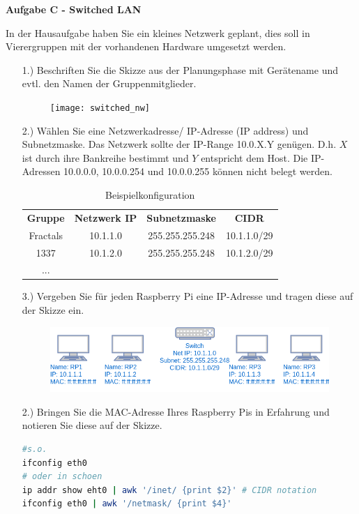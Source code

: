 \documentclass[paper=a4,fontsize=11pt]{scrartcl}%
\numberwithin{equation}{section}
\begin{document}
\begin{center}\Large{\textbf{Aufgabe C - Switched LAN}}\end{center}\vskip0.25in
In der Hausaufgabe haben Sie ein kleines Netzwerk geplant, dies soll in Vierergruppen mit der vorhandenen Hardware umgesetzt werden.
\begin{itemize}
	\item[1.)] Beschriften Sie die Skizze aus der Planungsphase mit Gerätename und evtl. den Namen der Gruppenmitglieder.
	\begin{figure}[H]
	\centering
	\texttt{[image: switched\_nw]}
	\end{figure}
	\item[2.)]  Wählen Sie eine Netzwerkadresse/ IP-Adresse (IP address) und Subnetzmaske. Das Netzwerk sollte der IP-Range 10.0.X.Y genügen. D.h. $X$ ist durch ihre Bankreihe bestimmt und $Y$ entspricht dem Host. Die IP-Adressen 10.0.0.0, 10.0.0.254 und 10.0.0.255 können nicht belegt werden.
	\begin{table}[H]
\centering
\caption{Beispielkonfiguration}
\label{my-label}
\begin{tabular}{cccc}
\textbf{Gruppe} & \textbf{Netzwerk IP} & \textbf{Subnetzmaske} & \textbf{CIDR}\\ 
Fractals & 10.1.1.0 & 255.255.255.248 & 10.1.1.0/29  \\
1337 & 10.1.2.0 & 255.255.255.248 & 10.1.2.0/29 \\
... & & &
\end{tabular}
\end{table}
	\item[3.)] Vergeben Sie für jeden Raspberry Pi eine IP-Adresse und tragen diese auf der Skizze ein.
	\begin{figure}[H]
	\centering
	\includegraphics[scale=0.5]{switched_nw_full}
\end{figure}		
	\item[2.)] Bringen Sie die MAC-Adresse Ihres Raspberry Pis in Erfahrung und notieren Sie diese auf der Skizze.
	\begin{lstlisting}[style=Bash, language=Bash]
#s.o.
ifconfig eth0
# oder in schoen
ip addr show eht0 | awk '/inet/ {print $2}' # CIDR notation
ifconfig eth0 | awk '/netmask/ {print $4}'

\end{lstlisting}
\end{itemize}
\end{document}
